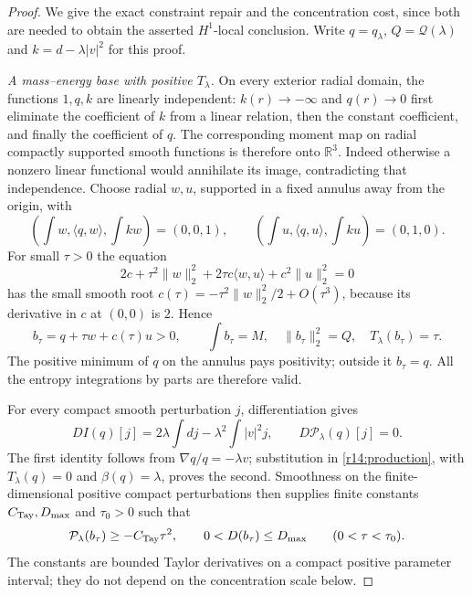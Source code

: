 \documentclass[11pt]{article}
\numberwithin{equation}{section}
\newcommand{\R}{\mathbb R}
\begin{document}
\begin{proof}
We give the exact constraint repair and the concentration cost, since
both are needed to obtain the asserted $H^1$-local conclusion. Write
$q=q_\lambda$, $Q=\mathcal Q(\lambda)$ and
$k=d-\lambda|v|^2$ for this proof.

\emph{A mass--energy base with positive $T_\lambda$.}
On every exterior radial domain, the functions $1,q,k$ are linearly
independent: $k(r)\to-\infty$ and $q(r)\to0$ first eliminate the
coefficient of $k$ from a linear relation, then the constant coefficient,
and finally the coefficient of $q$. The corresponding moment map on
radial compactly supported smooth functions is therefore onto $\R^3$.
Indeed otherwise a nonzero linear functional would annihilate its image,
contradicting that independence. Choose radial $w,u$, supported in a
fixed annulus away from the origin, with
\begin{equation}\label{r14:basemoments}
 (\int w,\langle q,w\rangle,\int kw)=(0,0,1),\qquad
 (\int u,\langle q,u\rangle,\int ku)=(0,1,0).
\end{equation}
For small $\tau>0$ the equation
\[
 2c+\tau^2\|w\|_2^2+2\tau c\langle w,u\rangle+c^2\|u\|_2^2=0
\]
has the small smooth root
$c(\tau)=-\tau^2\|w\|_2^2/2+O(\tau^3)$, because its derivative in
$c$ at $(0,0)$ is $2$. Hence
\begin{equation}\label{r14:baseprofile}
 b_\tau=q+\tau w+c(\tau)u>0,\qquad
 \int b_\tau=M,\quad \|b_\tau\|_2^2=Q,\quad
 T_\lambda(b_\tau)=\tau.
\end{equation}
The positive minimum of $q$ on the annulus pays positivity; outside it
$b_\tau=q$. All the entropy integrations by parts are therefore valid.

For every compact smooth perturbation $j$, differentiation gives
\[
 DI(q)[j]=2\lambda\int dj-\lambda^2\int|v|^2j,
 \qquad D\mathcal P_\lambda(q)[j]=0.
\]
The first identity follows from $\nabla q/q=-\lambda v$; substitution
in \eqref{r14:production}, with $T_\lambda(q)=0$ and
$\beta(q)=\lambda$, proves the second. Smoothness on the finite-dimensional
positive compact perturbations then supplies finite constants
$C_{\rm Tay},D_{\max}$ and $\tau_0>0$ such that
\begin{equation}\label{r14:baseproduction}
 \mathcal P_\lambda(b_\tau)\ge-C_{\rm Tay}\tau^2,
 \qquad 0<D(b_\tau)\le D_{\max}\qquad(0<\tau<\tau_0).
\end{equation}
The constants are bounded Taylor derivatives on a compact positive
parameter interval; they do not depend on the concentration scale below.


\end{proof}
\end{document}
